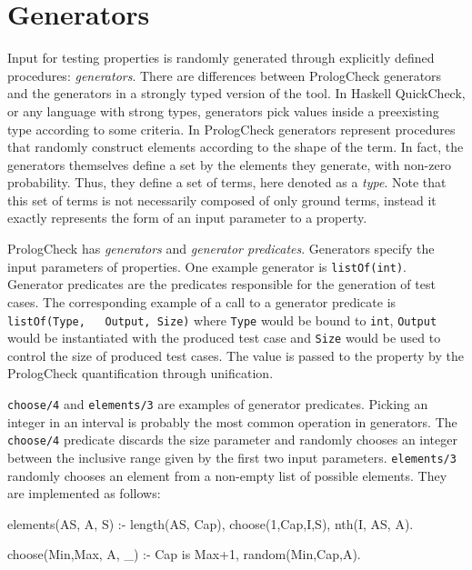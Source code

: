 \documentclass[runningheads,a4paper]{llncs}
\newcommand{\yap}[1]{\lstinline[style=yap]{#1}}
\newcommand{\Haskell}[0]{{\sf Haskell}}
\newcommand{\QuickCheck}[0]{{\sf QuickCheck}}
\newcommand{\plqc}[0]{{\sf PrologCheck}}
\begin{document}


\section{Generators}
\label{sec:generators}
Input for testing properties is randomly generated through explicitly
defined procedures: \emph{generators}.
%
There are  differences between \plqc{} generators and the
generators in a strongly typed version of the tool.
%
In \Haskell{} \QuickCheck{}, or any language with strong types,
generators pick values inside a preexisting type according to some criteria.
%
In \plqc{} generators represent procedures that randomly construct
elements according to the shape of the term.
%
In fact, the generators themselves define a set by the elements they
generate, with non-zero probability.
%
Thus, they define a set of terms, here denoted as a \emph{type}.
%
Note that this set of terms is not necessarily composed of only ground
terms, instead it exactly represents the form of an input parameter to a
property.



\plqc{} has {\it generators} and {\it generator
predicates}.
%
Generators specify the input parameters of properties.
%
One example generator is \yap{listOf(int)}.
%
Generator predicates are the predicates responsible for the generation
of test cases.
%
The corresponding example of a call to a generator predicate is \yap{listOf(Type,
  Output, Size)} where \yap{Type} would be bound to \yap{int},
\yap{Output} would be instantiated with the produced test case and
\yap{Size} would be used to control the size of produced test cases.
%
The value is passed to the property by the \plqc{} quantification
through unification.


  \yap{choose/4} and \yap{elements/3} are examples of generator
predicates.
%
Picking an integer in an interval is probably the most common operation
in generators.
%
The \yap{choose/4} predicate discards the size parameter and randomly
chooses an integer between the inclusive range given by the first two
input parameters.
%
\yap{elements/3}  randomly chooses an element from a non-empty list of
possible elements.
%
They are implemented as follows:
\begin{yapcode}
 elements(AS, A, S) :-
   length(AS, Cap), choose(1,Cap,I,S), nth(I, AS, A).

 choose(Min,Max, A, _) :- Cap is Max+1, random(Min,Cap,A).
\end{yapcode}
\end{document}
